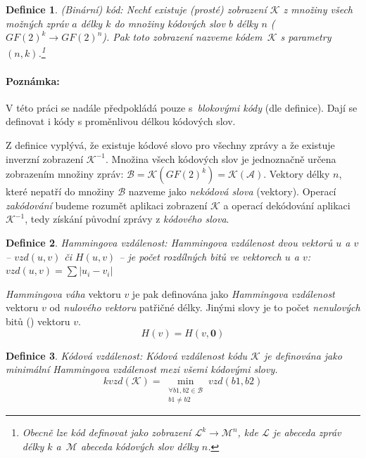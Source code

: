 \documentclass[thesis=M,czech,hidelinks]{FITthesis}[2012/06/26]
\newcommand{\0}{{\textcolor[gray]{0.80}{0}}}
\newtheorem{definice}{Definice}
\begin{document}
\begin{definice}{(Binární) kód:}
    Nechť existuje (prosté) zobrazení $\mathcal{K}$ z množiny všech možných
    zpráv $a$ délky $k$ do množiny kódových slov $b$ délky $n$
    ($GF(2)^k \rightarrow GF(2)^n$). Pak toto zobrazení nazveme
    kódem~$\mathcal{K}$ s parametry $(n,k)$.\footnote{
        Obecně lze \emph{kód} definovat jako zobrazení $\mathcal{L}^k
        \rightarrow \mathcal{M}^n$, kde $\mathcal{L}$ je \emph{abeceda} zpráv
        délky $k$ a~$\mathcal{M}$ abeceda kódových slov délky $n$.
    }
\end{definice}

\paragraph{Poznámka:} V této práci se nadále předpokládá pouze s~\emph{blokovými
kódy} (dle definice).  Dají se definovat i kódy s proměnlivou délkou kódových
slov.

Z definice vyplývá, že existuje kódové slovo pro všechny zprávy a že existuje
inverzní zobrazení $\mathcal{K}^{-1}$. Množina všech kódových slov je
jednoznačně určena zobrazením množiny zpráv:
$\mathcal{B}=\mathcal{K}(GF(2)^k)=\mathcal{K}(\mathcal{A})$. Vektory délky $n$,
které nepatří do množiny $\mathcal{B}$ nazveme jako \emph{nekódová slova}
(vektory). Operací \emph{zakódování} budeme rozumět aplikaci zobrazení
$\mathcal{K}$ a operací dekódování aplikaci $\mathcal{K}^{-1}$, tedy získání
původní zprávy z \emph{kódového slova}.

\begin{definice}{Hammingova vzdálenost:}
    \emph{Hammingova vzdálenost} dvou vektorů $u$ a $v$ -- $vzd(u,v)$ či
    $H(u,v)$ -- je počet rozdílných \emph{bitů} ve vektorech $u$ a $v$:
    $vzd(u,v) = \sum \left| u_i - v_i \right|$
\end{definice}

\emph{Hammingova váha} vektoru $v$ je pak definována jako \emph{Hammingova
vzdálenost} vektoru $v$ od \emph{nulového vektoru} patřičné délky. Jinými slovy
je to počet \emph{nenulových} bitů () vektoru $v$.
$$ H(v) = H(v,\mathbf{0}) $$


\begin{definice}{Kódová vzdálenost:}
    Kódová vzdálenost kódu $\mathcal{K}$ je definována jako minimální
    \emph{Hammingova vzdálenost} mezi všemi kódovými slovy.
    $$
        kvzd(\mathcal{K}) =
        \min_{\substack{\forall b1,b2 \in \mathcal{B} \\ b1 \neq b2}} vzd(b1,b2)
    $$
\end{definice}
\end{document}
